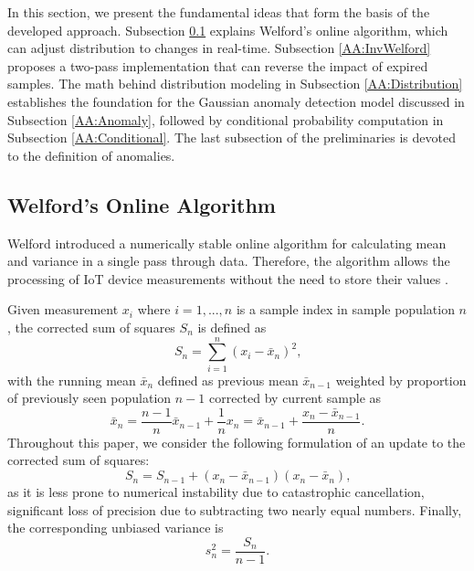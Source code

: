In this section, we present the fundamental ideas that form the basis of the developed approach. Subsection \ref{AA:Welford} explains Welford's online algorithm, which can adjust distribution to changes in real-time. Subsection \ref{AA:InvWelford} proposes a two-pass implementation that can reverse the impact of expired samples. The math behind distribution modeling in Subsection \ref{AA:Distribution} establishes the foundation for the Gaussian anomaly detection model discussed in Subsection \ref{AA:Anomaly}, followed by conditional probability computation in Subsection \ref{AA:Conditional}. The last subsection of the preliminaries is devoted to the definition of anomalies.

\subsection{Welford's Online Algorithm}\label{AA:Welford}
Welford introduced a numerically stable online algorithm for calculating mean and variance in a single pass through data. Therefore, the algorithm allows the processing of IoT device measurements without the need to store their values \citep{Wel62}.

Given measurement \(x_i\) where \(i=1,...,n\) is a sample index in sample population \(n\), the corrected sum of squares \(S_n\) is defined as
\begin{equation}
S_n = \sum_{i=1}^n (x_i - \bar x_n)^2\text{,}\label{eq:sumsquares}
\end{equation}
with the running mean \(\bar x_n\) defined as previous mean \(\bar x_{n-1}\) weighted by proportion of previously seen population \(n-1\) corrected by current sample as
\begin{equation}
\bar x_n = \frac{n-1}{n} \bar x_{n-1} + \frac{1}{n}x_n = \bar x_{n-1} + \frac{x_n - \bar x_{n-1}}{n}\text{.}\label{eq:runmean}
\end{equation}
Throughout this paper, we consider the following formulation of an update to the corrected sum of squares:
\begin{equation}
S_n = S_{n-1} + (x_n - \bar x_{n-1})(x_n - \bar x_n)\text{,}\label{eq:upsumsquares}
\end{equation}
as it is less prone to numerical instability due to catastrophic cancellation, significant loss of precision due to subtracting two nearly equal numbers. Finally, the corresponding unbiased variance is
\begin{equation}
s^2_n = \frac{S_{n}}{n-1}\text{.}\label{eq:runvar}
\end{equation}

